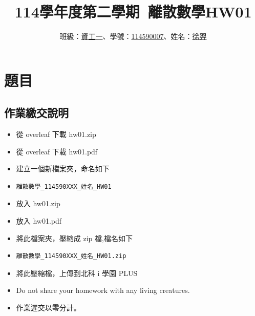 \documentclass[sigconf]{acmart}
\begin{document}
\title{114學年度第二學期~離散數學HW01}

\author{班級：\underline{資工一}、學號：\underline{114590007}、姓名：\underline{徐羿}}
\orcid{}
\affiliation{%
  \institution{}
  \city{}
  \country{}
}

\renewcommand\footnotetextcopyrightpermission[1]{} %
\pagestyle{plain} %

\maketitle


\section{題目}
\subsection{作業繳交說明}
\begin{shaded}
\begin{itemize}
    \item[-] 從 overleaf 下載 hw01.zip
    \item[-] 從 overleaf 下載 hw01.pdf
    \item[-] 建立一個新檔案夾，命名如下
    \item[-] \color{red}\begin{verbatim}離散數學_114590XXX_姓名_HW01\end{verbatim}\color{black}
    \item[-] 放入 hw01.zip
    \item[-] 放入 hw01.pdf
    \item[-] 將此檔案夾，壓縮成 zip 檔,檔名如下
    \item[-] \color{red}\begin{verbatim}離散數學_114590XXX_姓名_HW01.zip\end{verbatim}\color{black}
    \item[-] 將此壓縮檔，上傳到北科 i 學園 PLUS
    \item[-] Do not share your homework with any living creatures.
    \item[-] 作業遲交以零分計。
\end{itemize}
\end{shaded}
\end{document}
